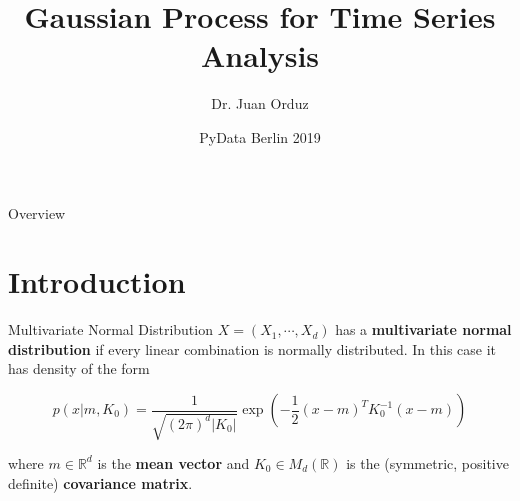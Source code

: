 \documentclass[10pt]{beamer}
\title[Gaussian Process for Time Series Analysis] %
{Gaussian Process for Time Series Analysis}
\author[Dr. Juan Orduz] %
{Dr. Juan Orduz}
\institute[PyData Berlin 2018] %
{

}
\date[ PyData Berlin 2018] %
{ PyData Berlin 2019}
\begin{document}
\begin{frame}
  \titlepage
\end{frame}


\begin{frame}{Overview}
\tableofcontents
\end{frame}

\section{Introduction}

\begin{frame}{Multivariate Normal Distribution}
$X = (X_1, \cdots, X_d)$ has a{ \bf multivariate normal distribution} if every linear combination is normally distributed. In this case it has density of the form

$$
p(x|m,K_0) =\frac{1}{\sqrt{(2\pi)^{d}|K_0|}}\exp\left(-\frac{1}{2}(x - m)^T K_0^{-1}(x - m)\right)
$$

where $m \in \mathbb{R}^d$ is the {\bf mean vector} and  $K_0 \in M_d(\mathbb{R})$ is the (symmetric, positive definite) {\bf covariance matrix}.


\end{frame}
\end{document}

